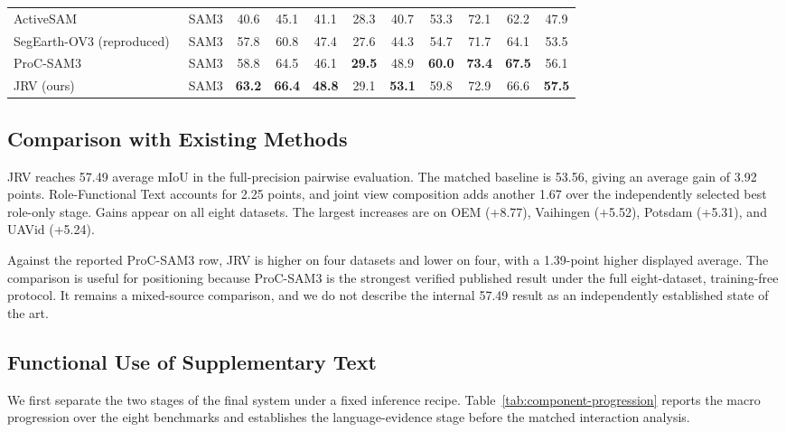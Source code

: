 \begin{table}[!t]
\begin{tabular}{lcccccccccc}
ActiveSAM~\cite{R35} & SAM3 & 40.6 & 45.1 & 41.1 & 28.3 & 40.7 & 53.3 & 72.1 & 62.2 & 47.9 \\
SegEarth-OV3 (reproduced)~\cite{R11} & SAM3 & 57.8 & 60.8 & 47.4 & 27.6 & 44.3 & 54.7 & 71.7 & 64.1 & 53.5 \\
ProC-SAM3~\cite{R12} & SAM3 & 58.8 & 64.5 & 46.1 & \textbf{29.5} & 48.9 & \textbf{60.0} & \textbf{73.4} & \textbf{67.5} & 56.1 \\
JRV (ours) & SAM3 & \textbf{63.2} & \textbf{66.4} & \textbf{48.8} & 29.1 & \textbf{53.1} & 59.8 & 72.9 & 66.6 & \textbf{57.5} \\
\bottomrule
\end{tabular}
\end{table}

\subsection{Comparison with Existing Methods}



JRV reaches 57.49 average mIoU in the full-precision pairwise evaluation. The matched baseline is 53.56, giving an average gain of 3.92 points. Role-Functional Text accounts for 2.25 points, and joint view composition adds another 1.67 over the independently selected best role-only stage. Gains appear on all eight datasets. The largest increases are on OEM (+8.77), Vaihingen (+5.52), Potsdam (+5.31), and UAVid (+5.24).

Against the reported ProC-SAM3 row, JRV is higher on four datasets and lower on four, with a 1.39-point higher displayed average. The comparison is useful for positioning because ProC-SAM3 is the strongest verified published result under the full eight-dataset, training-free protocol. It remains a mixed-source comparison, and we do not describe the internal 57.49 result as an independently established state of the art.

\subsection{Functional Use of Supplementary Text}

We first separate the two stages of the final system under a fixed inference recipe. Table~\ref{tab:component-progression} reports the macro progression over the eight benchmarks and establishes the language-evidence stage before the matched interaction analysis.

